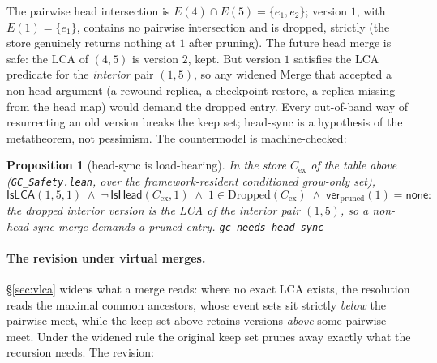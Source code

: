 \documentclass[11pt]{article}
\newtheorem{proposition}[theorem]{Proposition}
\newcommand{\lean}[1]{\texttt{#1}}
\begin{document}
\noindent The pairwise head intersection is $E(4) \cap E(5) =
\{e_1,e_2\}$; version $1$, with $E(1) = \{e_1\}$, contains no pairwise
intersection and is dropped, strictly (the store genuinely returns
nothing at $1$ after pruning). The future head merge is safe: the LCA
of $(4,5)$ is version $2$, kept. But version $1$ satisfies the LCA
predicate for the \emph{interior} pair $(1,5)$, so any widened Merge
that accepted a non-head argument (a rewound replica, a checkpoint
restore, a replica missing from the head map) would demand the dropped
entry. Every out-of-band way of resurrecting an old version breaks the
keep set; head-sync is a hypothesis of the metatheorem, not pessimism.
The countermodel is machine-checked:

\begin{proposition}[head-sync is load-bearing]
\label{prop:headsync}
In the store $C_{\mathrm{ex}}$ of the table above
(\lean{GC\_Safety.lean}, over the framework-resident conditioned
grow-only set),
\[
  \mathsf{IsLCA}(1, 5, 1)
  \;\wedge\; \neg\, \mathsf{IsHead}(C_{\mathrm{ex}}, 1)
  \;\wedge\; 1 \in \mathrm{Dropped}(C_{\mathrm{ex}})
  \;\wedge\; \mathsf{ver}_{\mathrm{pruned}}(1) = \mathsf{none} :
\]
the dropped interior version is the LCA of the interior pair $(1, 5)$,
so a non-head-sync merge demands a pruned entry.
\hfill\lean{gc\_needs\_head\_sync}
\end{proposition}

\paragraph{The revision under virtual merges.} \S\ref{sec:vlca} widens
what a merge reads: where no exact LCA exists, the resolution reads the
maximal common ancestors, whose event sets sit strictly \emph{below}
the pairwise meet, while the keep set above retains versions
\emph{above} some pairwise meet. Under the widened rule the original
keep set prunes away exactly what the recursion needs. The revision:
\end{document}

